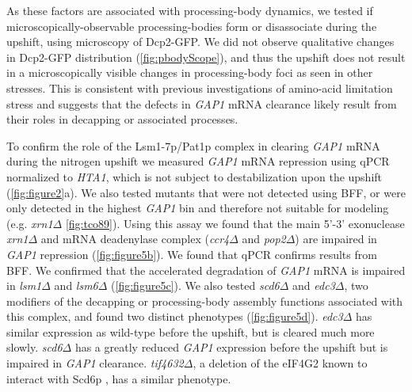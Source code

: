 {As these factors are associated with processing-body dynamics, 
we tested if microscopically-observable processing-bodies form or
disassociate during the upshift, using microscopy of Dcp2-GFP. 
We did not observe qualitative changes
in Dcp2-GFP distribution (\autoref{fig:pbodyScope}),
and thus the upshift does not
result in a microscopically visible changes in processing-body foci
as seen in other stresses. This is consistent with previous
investigations of amino-acid limitation stress
\parencite{hoyle2007stress} and
suggests that the defects in \textit{GAP1} mRNA clearance likely 
result from their roles in decapping or associated processes.


To confirm the role of the Lsm1-7p/Pat1p  complex in clearing \textit{GAP1}
mRNA during the nitrogen upshift we measured \textit{GAP1} mRNA
repression using qPCR normalized to
\textit{HTA1}, which is not subject to destabilization upon the upshift
(\autoref{fig:figure2}a). We also tested mutants that were not detected using BFF,
or were only detected in the highest \textit{GAP1} bin and therefore
not suitable for modeling
(e.g. \textit{xrn1}$\Delta$ \autoref{fig:tco89}). 
Using this assay we found that the main 5’-3’ 
exonuclease \textit{xrn1}$\Delta$ 
and mRNA deadenylase complex (\textit{ccr4}$\Delta$ and
\textit{pop2}$\Delta$) are impaired in \textit{GAP1} repression 
(\autoref{fig:figure5b}).
We found that qPCR confirms results from BFF.
We confirmed that the accelerated degradation of \textit{GAP1} mRNA is impaired
in \textit{lsm1}$\Delta$ and \textit{lsm6}$\Delta$ 
(\autoref{fig:figure5c}). 
We also tested
\textit{scd6}$\Delta$ and \textit{edc3}$\Delta$, two modifiers of the
decapping or processing-body
assembly functions associated with this complex, and found two
distinct phenotypes (\autoref{fig:figure5d}). \textit{edc3}$\Delta$ has similar expression 
as wild-type before the upshift, but is cleared much more slowly.
\textit{scd6}$\Delta$ has a greatly reduced \textit{GAP1} expression
before the upshift but is impaired in \textit{GAP1} clearance. 
\textit{tif4632}$\Delta$, a deletion of the eIF4G2
known to interact with Scd6p \parencite{rajyaguru2012scd6}, 
has a similar phenotype. 

}
